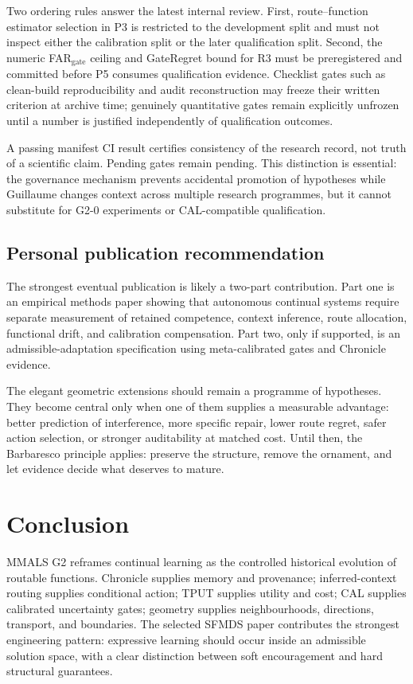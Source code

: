 \documentclass[11pt,a4paper]{article}
\begin{document}
Two ordering rules answer the latest internal review. First, route--function estimator selection in P3 is restricted to the development split and must not inspect either the calibration split or the later qualification split. Second, the numeric FAR$_{\mathrm{gate}}$ ceiling and GateRegret bound for R3 must be preregistered and committed before P5 consumes qualification evidence. Checklist gates such as clean-build reproducibility and audit reconstruction may freeze their written criterion at archive time; genuinely quantitative gates remain explicitly unfrozen until a number is justified independently of qualification outcomes.

A passing manifest CI result certifies consistency of the research record, not truth of a scientific claim. Pending gates remain pending. This distinction is essential: the governance mechanism prevents accidental promotion of hypotheses while Guillaume changes context across multiple research programmes, but it cannot substitute for G2-0 experiments or CAL-compatible qualification.

\subsection{Personal publication recommendation}
The strongest eventual publication is likely a two-part contribution. Part one is an empirical methods paper showing that autonomous continual systems require separate measurement of retained competence, context inference, route allocation, functional drift, and calibration compensation. Part two, only if supported, is an admissible-adaptation specification using meta-calibrated gates and Chronicle evidence.

The elegant geometric extensions should remain a programme of hypotheses. They become central only when one of them supplies a measurable advantage: better prediction of interference, more specific repair, lower route regret, safer action selection, or stronger auditability at matched cost. Until then, the Barbaresco principle applies: preserve the structure, remove the ornament, and let evidence decide what deserves to mature.

\section{Conclusion}
MMALS G2 reframes continual learning as the controlled historical evolution of routable functions. Chronicle supplies memory and provenance; inferred-context routing supplies conditional action; TPUT supplies utility and cost; CAL supplies calibrated uncertainty gates; geometry supplies neighbourhoods, directions, transport, and boundaries. The selected SFMDS paper contributes the strongest engineering pattern: expressive learning should occur inside an admissible solution space, with a clear distinction between soft encouragement and hard structural guarantees.
\end{document}
